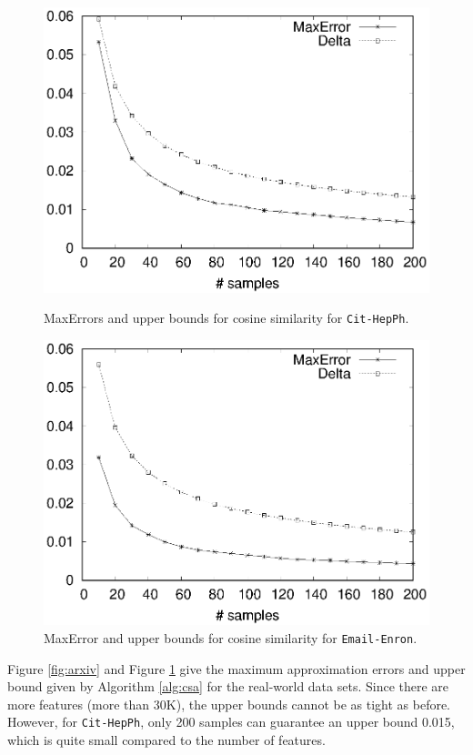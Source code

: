 \documentclass[sigconf,anonymous]{acmart}
\begin{document}
\begin{figure}[!t]
\centering
\begin{minipage}{.45\textwidth}
\centering
\includegraphics[width=.9\textwidth]{cos_arxiv_apprx_error.eps}
\caption{\textsf{MaxError}s and upper bounds for cosine similarity for \texttt{Cit-HepPh}.}
\label{fig:arxiv}
\end{minipage}
\hspace{1cm}
\begin{minipage}{.45\textwidth}
\centering
\includegraphics[width=.9\textwidth]{cos_email_apprx_error.eps}
\caption{\textsf{MaxError} and upper bounds for cosine similarity for \texttt{Email-Enron}.}
\label{fig:email}
\end{minipage}
\end{figure}

Figure \ref{fig:arxiv} and Figure \ref{fig:email} give the maximum approximation errors and upper bound given by Algorithm \ref{alg:csa} for the real-world data sets. Since there are more features (more than 30K), the upper bounds cannot be as tight as before. However, for \texttt{Cit-HepPh}, only 200 samples can guarantee an upper bound 0.015, which is quite small compared to the number of features. 
\end{document}

